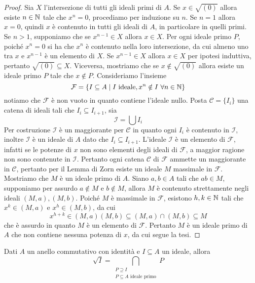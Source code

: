 \documentclass[11pt]{scrartcl}
\begin{document}
\begin{proof}
    Sia $X$ l'intersezione di tutti gli ideali primi di $A$. 
    Se $x \in \sqrt{(0)}$ allora esiste $n \in \mathbb N$ tale che $x^n = 0$, procediamo
    per induzione su $n$. Se $n = 1$ allora $x = 0$, quindi $x$ è contenuto 
    in tutti gli ideali di $A$, in particolare in quelli primi. Se $n > 1$, 
    supponiamo che se $x^{n - 1} \in X$ allora $x \in X$.
    Per ogni ideale primo $P$, poiché $x^n = 0$ si ha che $x^n$ è contenuto nella
    loro intersezione, da cui almeno uno tra $x$ e $x^{n - 1}$ è un elemento
    di $X$. Se $x^{n - 1} \in X$ allora $x \in X$ per ipotesi induttiva, pertanto 
    $\sqrt{(0)} \subseteq X$. Viceversa, mostriamo che se $x \notin \sqrt{(0)}$
    allora esiste un ideale primo $P$ tale che $x \notin P$. Consideriamo 
    l'insieme
    \[
        \mathcal{F} = \{I \subseteq A \mid I \text{ ideale}, x^n \notin I
        ~\forall n \in \mathbb N\}
    \]
    notiamo che $\mathcal{F}$ è non vuoto in quanto contiene l'ideale nullo.
    Posta $\mathscr{C} = \{I_i\}$ una catena di ideali tali che $I_i \subseteq I_{i + 1}$,
    sia
    \[
        \mathcal{I} = \bigcup I_i
    \]
    Per costruzione $\mathcal{I}$ è un maggiorante per $\mathscr{C}$ in quanto
    ogni $I_i$ è contenuto in $\mathcal{I}$, inoltre $\mathcal{I}$
    è un ideale di $A$ dato che $I_i \subseteq I_{i + 1}$. L'ideale $\mathcal{I}$
    è un elemento di $\mathcal{F}$, infatti se le potenze di $x$ non sono elementi
    degli ideali di $\mathcal{F}$, a maggior ragione non sono contenute in $\mathcal{I}$.
    Pertanto ogni catena $\mathscr{C}$ di $\mathcal{F}$ ammette un maggiorante 
    in $\mathscr{C}$, pertanto per il Lemma di Zorn esiste un ideale $M$ massimale
    in $\mathcal{F}$. Mostriamo che $M$ è un ideale primo di $A$. Siano $a, b \in A$
    tali che $ab \in M$, supponiamo per assurdo $a \notin M$ e $b \notin M$,
    allora $M$ è contenuto strettamente negli ideali $(M, a), (M, b)$. Poiché
    $M$ è massimale in $\mathcal{F}$, esistono $h, k \in \mathbb N$ tali che $x^k \in (M, a)$
    e $x^h \in (M, b)$, da cui
    \[
        x^{h + k} \in (M, a)(M, b) \subseteq (M, a)\cap (M, b) \subseteq M
    \]
    che è assurdo in quanto $M$ è un elemento di $\mathcal{F}$. Pertanto 
    $M$ è un ideale primo di $A$ che non contiene nessuna potenza di $x$, 
    da cui segue la tesi.
\end{proof}

\begin{corollary}
    Dati $A$ un anello commutativo con identità e $I\subseteq A$ un ideale, 
    allora
    \[
        \sqrt{I} = \bigcap_{\substack{P\supseteq I\\ P \subseteq A\text{ ideale primo}}}P
    \]
\end{corollary}
\end{document}
